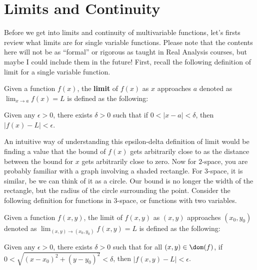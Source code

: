 \documentclass[../../../main.tex]{subfiles}
\begin{document}
\section{Limits and Continuity}

Before we get into limits and continuity of multivariable functions,
let's firsts review what limits are for single variable functions.
Please note that the contents here will not be as ``formal'' or
rigorous as taught in Real Analysis courses, but maybe I could
include them in the future! First, recall the following definition
of limit for a single variable function.

\begin{definition}{}{}
Given a function $f(x)$, the \textbf{limit} of $f(x)$ as $x$
approaches $a$ denoted as $\lim_{x \to a} f(x) = L$ is defined
as the following:
\vspace{0.8\baselineskip}
\begin{center}
\begin{minipage}{0.7\textwidth}
Given any $\epsilon > 0$, there exists $\delta > 0$ such that
if $0 < | x - a | < \delta$, then $| f(x) - L | < \epsilon$.
\end{minipage}
\end{center}
\end{definition}

An intuitive way of understanding this epsilon-delta definition of
limit would be finding a value that the bound of $f(x)$ gets
arbitrarily close to as the distance between the bound for $x$ gets
arbitrarily close to zero. Now for $2$-space, you are probably
familiar with a graph involving a shaded rectangle. For $3$-space,
it is similar, be we can think of it as a circle. Our bound is no
longer the width of the rectangle, but the radius of the circle
surrounding the point. Consider the following definition for
functions in $3$-space, or functions with two variables.

\begin{definition}{}{}
Given a function $f(x, y)$, the limit of $f(x, y)$ as $(x, y)$
approaches $(x_0, y_0)$ denoted as $\lim_{(x, y) \to (x_0, y_0)}
f(x, y) = L$ is defined as the following:
\vspace{0.6\baselineskip}
\begin{center}
\begin{minipage}{0.8\textwidth}
Given any $\epsilon > 0$, there exists $\delta > 0$ such that
for all $(x, y) \in \dom(f)$, if $0 < \sqrt{(x - x_0)^2 + (y - y_0)^2}
< \delta$, then $| f(x, y) - L | < \epsilon$.
\end{minipage}
\end{center}
\end{definition}
\end{document}
